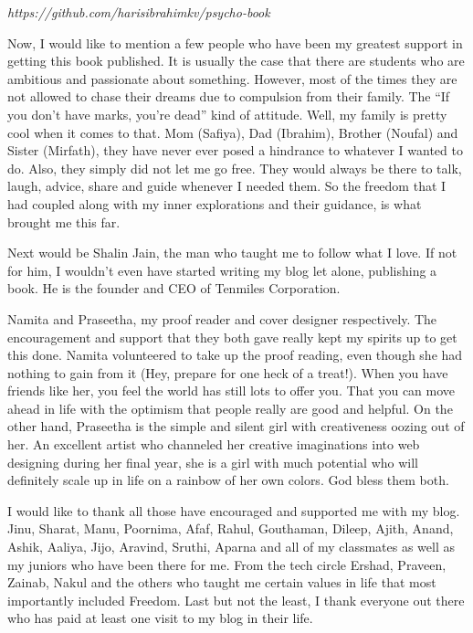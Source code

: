 \documentclass[twoside,11pt,titlepage]{article}
\begin{document}
\emph{https://github.com/harisibrahimkv/psycho-book}

Now, I would like to mention a few people who have been my greatest support in getting this book published. It is usually the case that there are students who are ambitious and passionate about something. However, most of the times they are not allowed to chase their dreams due to compulsion from their family. The ``If you don't have marks, you're dead'' kind of attitude. Well, my family is pretty cool when it comes to that. Mom (Safiya), Dad (Ibrahim), Brother (Noufal) and Sister (Mirfath), they have never ever posed a hindrance to whatever I wanted to do. Also, they simply did not let me go free. They would always be there to talk, laugh, advice, share and guide whenever I needed them. So the freedom that I had coupled along with my inner explorations and their guidance, is what brought me this far.

Next would be Shalin Jain, the man who taught me to follow what I love. If not for him, I wouldn't even have started writing my blog let alone, publishing a book. He is the founder and CEO of Tenmiles Corporation.

Namita and Praseetha, my proof reader and cover designer respectively. The encouragement and support that they both gave really kept my spirits up to get this done. Namita volunteered to take up the proof reading, even though she had nothing to gain from it (Hey, prepare for one heck of a treat!). When you have friends like her, you feel the world has still lots to offer you. That you can move ahead in life with the optimism that people really are good and helpful. On the other hand, Praseetha is the simple and silent girl with creativeness oozing out of her. An excellent artist who channeled her creative imaginations into web designing during her final year, she is a girl with much potential who will definitely scale up in life on a rainbow of her own colors. God bless them both.

I would like to thank all those have encouraged and supported me with my blog. Jinu, Sharat, Manu, Poornima, Afaf, Rahul, Gouthaman, Dileep, Ajith, Anand, Ashik, Aaliya, Jijo, Aravind, Sruthi, Aparna and all of my classmates as well as my juniors who have been there for me. From the tech circle Ershad, Praveen, Zainab, Nakul and the others who taught me certain values in life that most importantly included Freedom. Last but not the least, I thank everyone out there who has paid at least one visit to my blog in their life.
\end{document}
